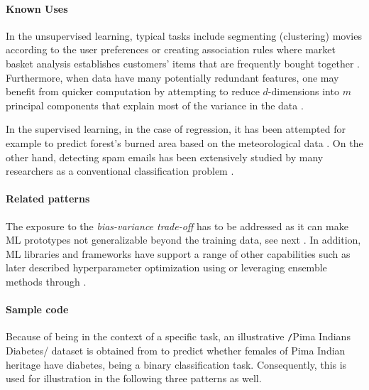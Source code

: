 \paragraph*{Known Uses}
\begin{compactitem}
  \item In the unsupervised learning, typical tasks include segmenting (clustering) movies according to the user preferences or creating association rules where market basket analysis establishes customers' items that are frequently bought together \parencites{Trevor2017}{ClusteringAnil2010}{Movies2012}{MBAMR2012}. 
  Furthermore, when data have many potentially redundant features, one may benefit from quicker computation by attempting to reduce $d$-dimensions into $m$ principal components that explain most of the variance in the data \parencites{FieldCadyDSBook}{Tillburg2009}.
  \item In the supervised learning, in the case of regression, it has been attempted for example to predict forest's burned area based on the meteorological data \parencite{ForestFires2007}.
  On the other hand, detecting spam emails has been extensively studied by many researchers as a conventional classification problem \parencite{Brylspam2008}.
\end{compactitem}

\paragraph*{Related patterns}
The exposure to the \emph{bias-variance trade-off} has to be addressed as it can make \ac{ML} prototypes not generalizable beyond the training data, see next .
In addition, \ac{ML} libraries and frameworks have support a range of other capabilities such as later described hyperparameter optimization using  or leveraging ensemble methods through .

\paragraph*{Sample code}
Because of being in the context of a specific task, an illustrative \texttt/Pima Indians Diabetes/ dataset is obtained from \textcite{Lichman:2013} to predict whether females of Pima Indian heritage have diabetes, being a binary classification task. 
Consequently, this is used for illustration in the following three patterns as well. 

